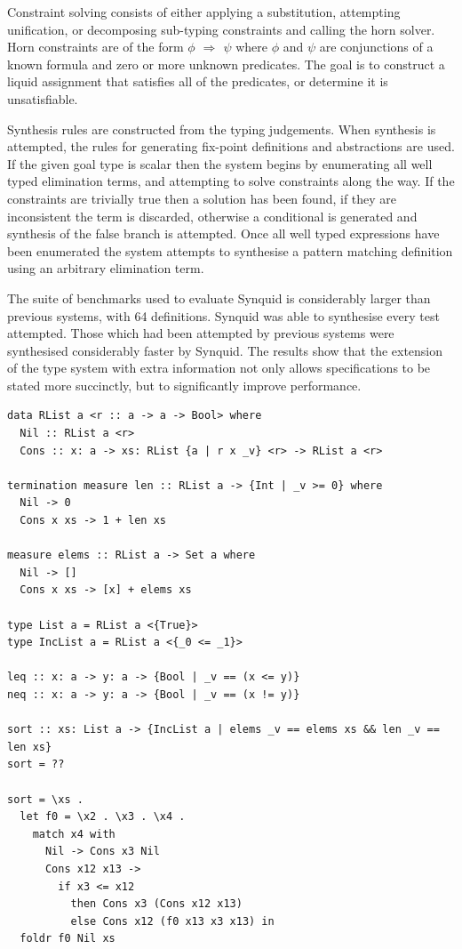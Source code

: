 \documentclass[a4paper]{article}
\begin{document}
Constraint solving consists of either applying a substitution, attempting unification, or decomposing sub-typing constraints 
and calling the horn solver. Horn constraints are of the form \emph{\(\phi\) \(\Rightarrow\) \(\psi\)} where \(\phi\) and \(\psi\) are conjunctions of a 
known formula and zero or more unknown predicates. The goal is to construct a liquid assignment that satisfies all of the 
predicates, or determine it is unsatisfiable.  

Synthesis rules are constructed from the typing judgements. When synthesis is attempted, the rules for generating 
fix-point definitions and abstractions are used. If the given goal type is scalar then the system begins by enumerating 
all well typed elimination terms, and attempting to solve constraints along the way. If the constraints are trivially 
true then a solution has been found, if they are inconsistent the term is discarded, otherwise a conditional is generated 
and synthesis of the false branch is attempted. Once all well typed expressions have been enumerated the system attempts
to synthesise a pattern matching definition using an arbitrary elimination term.


The suite of benchmarks used to evaluate Synquid is considerably larger than previous systems, with 64 definitions.
Synquid was able to synthesise every test attempted. Those which had been attempted by previous systems were synthesised 
considerably faster by Synquid. The results show that the extension of the type system with extra information not only allows
specifications to be stated more succinctly, but to significantly improve performance.


\begin{center}
\begin{verbatim}
data RList a <r :: a -> a -> Bool> where
  Nil :: RList a <r>
  Cons :: x: a -> xs: RList {a | r x _v} <r> -> RList a <r>

termination measure len :: RList a -> {Int | _v >= 0} where
  Nil -> 0
  Cons x xs -> 1 + len xs  

measure elems :: RList a -> Set a where
  Nil -> []
  Cons x xs -> [x] + elems xs  

type List a = RList a <{True}>
type IncList a = RList a <{_0 <= _1}>  

leq :: x: a -> y: a -> {Bool | _v == (x <= y)}
neq :: x: a -> y: a -> {Bool | _v == (x != y)} 

sort :: xs: List a -> {IncList a | elems _v == elems xs && len _v == len xs}
sort = ??

sort = \xs .
  let f0 = \x2 . \x3 . \x4 .
	match x4 with
	  Nil -> Cons x3 Nil
	  Cons x12 x13 ->
		if x3 <= x12
		  then Cons x3 (Cons x12 x13)
		  else Cons x12 (f0 x13 x3 x13) in
  foldr f0 Nil xs
\end{verbatim}
\end{center}
\end{document}
